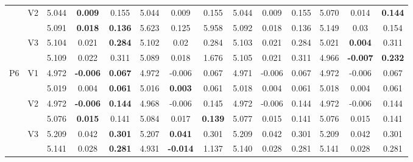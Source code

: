 \documentclass[12pt,a4paper]{article}
\begin{document}
\begin{sidewaystable}[ht]
{\begin{tabular}{cc|ccc|ccc|ccc|ccc|}
   & \multirow{2}{*}{V2} & 5.044 & \textbf{0.009} & 0.155 & 5.044 & 0.009 & 0.155 & 5.044 & 0.009 & 0.155 & 5.070 & 0.014 & \textbf{0.144} \\ 
   &  & 5.091 & \textbf{0.018} & \textbf{0.136} & 5.623 & 0.125 & 5.958 & 5.092 & 0.018 & 0.136 & 5.149 & 0.03 & 0.154 \\ 
   & \multirow{2}{*}{V3} & 5.104 & 0.021 & \textbf{0.284} & 5.102 & 0.02 & 0.284 & 5.103 & 0.021 & 0.284 & 5.021 & \textbf{0.004} & 0.311 \\ 
   &  & 5.109 & 0.022 & 0.311 & 5.089 & 0.018 & 1.676 & 5.105 & 0.021 & 0.311 & 4.966 & \textbf{-0.007} & \textbf{0.232} \\ 
   \hline \hline\multirow{6}{*}{P6} & \multirow{2}{*}{V1} & 4.972 & \textbf{-0.006} & \textbf{0.067} & 4.972 & -0.006 & 0.067 & 4.971 & -0.006 & 0.067 & 4.972 & -0.006 & 0.067 \\ 
   &  & 5.019 & 0.004 & \textbf{0.061} & 5.016 & \textbf{0.003} & 0.061 & 5.018 & 0.004 & 0.061 & 5.018 & 0.004 & 0.061 \\ 
   & \multirow{2}{*}{V2} & 4.972 & \textbf{-0.006} & \textbf{0.144} & 4.968 & -0.006 & 0.145 & 4.972 & -0.006 & 0.144 & 4.972 & -0.006 & 0.144 \\ 
   &  & 5.076 & \textbf{0.015} & 0.141 & 5.084 & 0.017 & \textbf{0.139} & 5.077 & 0.015 & 0.141 & 5.076 & 0.015 & 0.141 \\ 
   & \multirow{2}{*}{V3} & 5.209 & 0.042 & \textbf{0.301} & 5.207 & \textbf{0.041} & 0.301 & 5.209 & 0.042 & 0.301 & 5.209 & 0.042 & 0.301 \\ 
   &  & 5.141 & 0.028 & \textbf{0.281} & 4.931 & \textbf{-0.014} & 1.137 & 5.140 & 0.028 & 0.281 & 5.141 & 0.028 & 0.281 \\ 
   \hline
\end{tabular}
}
\end{sidewaystable}
\end{document}
